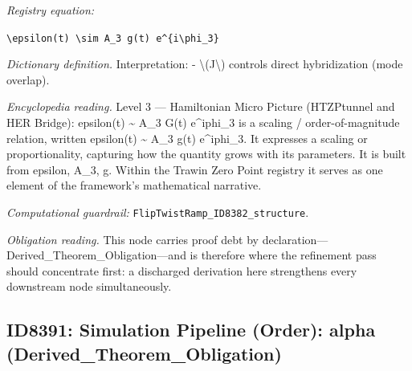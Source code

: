 \documentclass[11pt]{article}
\theoremstyle{remark}
\begin{document}
\noindent\textit{Registry equation:}\par
{\small\texttt{\textbackslash{}epsilon(t) \textbackslash{}sim A\_3 g(t) e\textasciicircum{}\{i\textbackslash{}phi\_3\}}}\par\medskip
\noindent\textit{Dictionary definition.} Interpretation: - \textbackslash{}(J\textbackslash{}) controls direct hybridization (mode overlap).\par\medskip
\noindent\textit{Encyclopedia reading.} Level 3 --- Hamiltonian Micro Picture (HTZPtunnel and HER Bridge): epsilon(t) \textasciitilde{} A\_3 G(t) e\textasciicircum{}iphi\_3 is a scaling / order-of-magnitude relation, written epsilon(t) \textasciitilde{} A\_3 g(t) e\textasciicircum{}iphi\_3. It expresses a scaling or proportionality, capturing how the quantity grows with its parameters. It is built from epsilon, A\_3, g. Within the Trawin Zero Point registry it serves as one element of the framework's mathematical narrative.
\par\medskip\noindent\textit{Computational guardrail:} \texttt{FlipTwistRamp\_ID8382\_structure}.
\par\medskip\noindent\textit{Obligation reading.} This node carries proof debt by declaration---Derived\_Theorem\_Obligation---and is therefore where the refinement pass should concentrate first: a discharged derivation here strengthens every downstream node simultaneously.

\subsection{ID8391: Simulation Pipeline (Order): alpha (Derived\_Theorem\_Obligation)}
\end{document}
